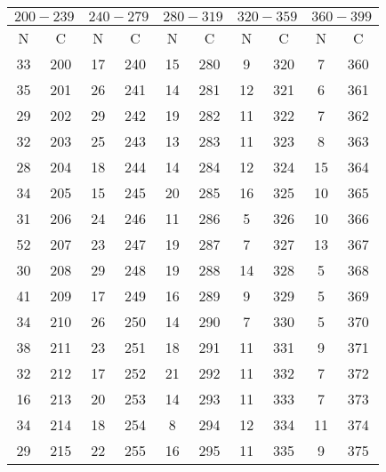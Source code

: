  \begin{table}
    \centering
    \caption{} 
    \label{}
    \label{2}
    \begin{tabular}{c c || c c || c c || c c || c c}
        \midrule
        \multicolumn{2}{c}{$200-239$} & \multicolumn{2}{c}{$240-279$} & \multicolumn{2}{c}{$280-319$} & \multicolumn{2}{c}{$320-359$} & \multicolumn{2}{c}{$360-399$} \\
        \midrule
        N & C & N & C & N & C & N & C & N & C \\
        \midrule
33      &200 & 17   &   240  & 15      &     280  &   9       &  320 & 7        & 360 \\   
35      &201 & 26   &   241  & 14      &     281  &   12      &  321 & 6        & 361 \\  
29      &202 & 29   &   242  & 19      &     282  &   11      &  322 & 7        & 362 \\  
32      &203 & 25   &   243  & 13      &     283  &   11      &  323 & 8        & 363 \\  
28      &204 & 18   &   244  & 14      &     284  &   12      &  324 & 15       & 364 \\  
34      &205 & 15   &   245  & 20      &     285  &   16      &  325 & 10       & 365 \\  
31      &206 & 24   &   246  & 11      &     286  &   5       &  326 & 10       & 366 \\  
52      &207 & 23   &   247  & 19      &     287  &   7       &  327 & 13       & 367 \\  
30      &208 & 29   &   248  & 19      &     288  &   14      &  328 & 5        & 368 \\  
41      &209 & 17   &   249  & 16      &     289  &   9       &  329 & 5        & 369 \\  
34      &210 & 26   &   250  & 14      &     290  &   7       &  330 & 5        & 370 \\  
38      &211 & 23   &   251  & 18      &     291  &   11      &  331 & 9        & 371 \\  
32      &212 & 17   &   252  & 21      &     292  &   11      &  332 & 7        & 372 \\  
16      &213 & 20   &   253  & 14      &     293  &   11      &  333 & 7        & 373 \\  
34      &214 & 18   &   254  & 8       &     294  &   12      &  334 & 11       & 374 \\  
29      &215 & 22   &   255  & 16      &     295  &   11      &  335 & 9        & 375 \\  

\end{tabular}
\end{table}
